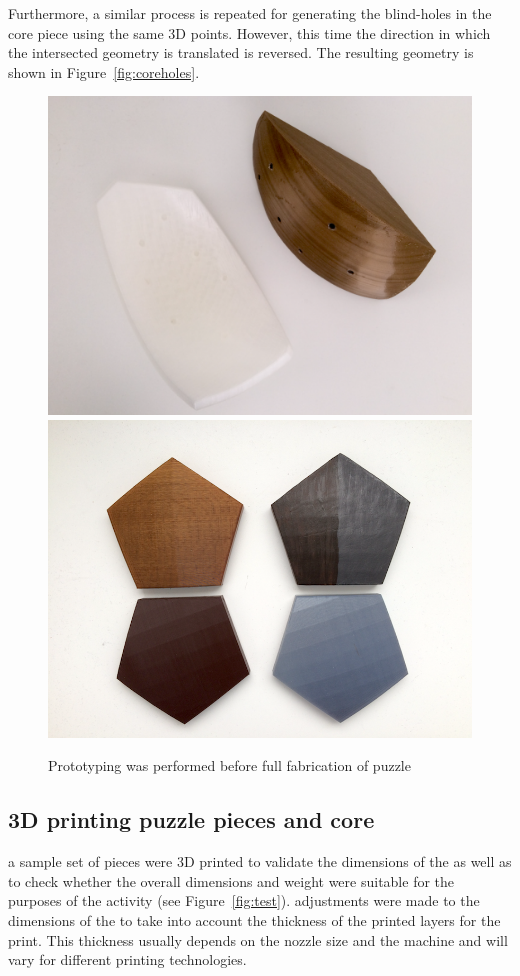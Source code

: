 \documentclass[acmlarge,screen,dvipsnames]{acmart}
\begin{document}
Furthermore, a similar process is repeated for generating the
blind-holes in the  core piece using the same 3D points. However, this
time the direction in which the intersected geometry is translated is
reversed. The resulting geometry is shown in
Figure~\ref{fig:coreholes}. %

\begin{figure}[H]
  \centering
  {\includegraphics[width=0.45\linewidth]{images/coreANDpiece}}
  {\includegraphics[width=0.45\linewidth]{images/colours}}

  \caption{
    Prototyping was performed before full fabrication of puzzle}
\end{figure}


\subsection{3D printing puzzle pieces and core}
 a sample set of pieces were 3D
printed to validate the dimensions of the  as well as to check
whether the overall dimensions and weight were suitable for the
purposes of the activity (see Figure~\ref{fig:test}). 
adjustments were made to the dimensions of the  to take into
account  the thickness of the printed layers for the print. This
thickness usually depends on the nozzle size and the machine and will
vary for different printing technologies.
%
\end{document}
